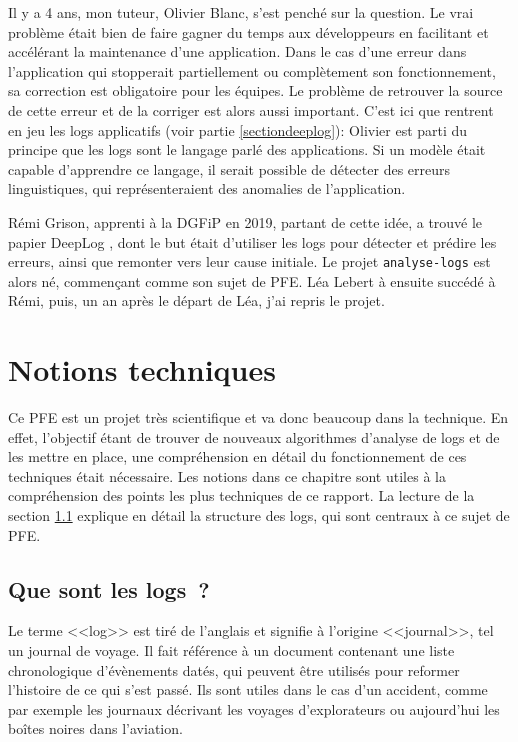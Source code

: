 \documentclass[openany, 11pt]{memoir}
\begin{document}
\bigskip
Il y a 4 ans, mon tuteur, Olivier Blanc, s'est penché sur la question. Le vrai problème était bien de faire gagner du temps aux développeurs en facilitant et accélérant la maintenance d'une application. Dans le cas d'une erreur dans l'application qui stopperait partiellement ou complètement son fonctionnement, sa correction est obligatoire pour les équipes. Le problème de retrouver la source de cette erreur et de la corriger est alors aussi important. C'est ici que rentrent en jeu les \glspl{log} applicatifs (voir partie \ref{sectiondeeplog}): Olivier est parti du principe que les logs sont le langage parlé des applications. Si un modèle était capable d'apprendre ce langage, il serait possible de détecter des erreurs linguistiques, qui représenteraient des anomalies de l'application.

Rémi Grison, apprenti à la DGFiP en 2019, partant de cette idée, a trouvé le papier DeepLog \cite{deeplog}, dont le but était d'utiliser les logs pour détecter et prédire les erreurs, ainsi que remonter vers leur cause initiale. Le projet \texttt{analyse-logs} est alors né, commençant comme son sujet de PFE. Léa Lebert à ensuite succédé à Rémi, puis, un an après le départ de Léa, j'ai repris le projet.

\newpage
\chapter{Notions techniques}

Ce PFE est un projet très scientifique et va donc beaucoup dans la technique. En effet, l'objectif étant de trouver de nouveaux algorithmes d'analyse de \glspl{log} et de les mettre en place, une compréhension en détail du fonctionnement de ces techniques était nécessaire. Les notions dans ce chapitre sont utiles à la compréhension des points les plus techniques de ce rapport. La lecture de la section \ref{logs} explique en détail la structure des logs, qui sont centraux à ce sujet de PFE.

\section{Que sont les logs~?}
\label{logs}

Le terme <<log>> est tiré de l'anglais et signifie à l'origine <<journal>>, tel un journal de voyage. Il fait référence à un document contenant une liste chronologique d'évènements datés, qui peuvent être utilisés pour reformer l'histoire de ce qui s'est passé. Ils sont utiles dans le cas d'un accident, comme par exemple les journaux décrivant les voyages d'explorateurs ou aujourd'hui les boîtes noires dans l'aviation.
\end{document}
